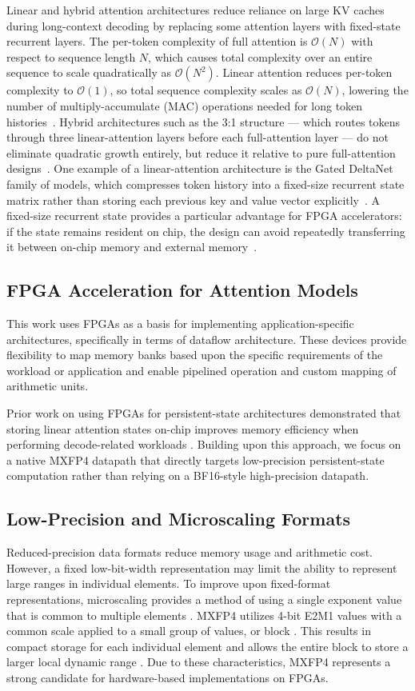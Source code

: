 ﻿\documentclass[conference]{IEEEtran}
\begin{document}
Linear and hybrid attention architectures reduce reliance on large KV caches during long-context decoding by replacing some attention layers with fixed-state recurrent layers. The per-token complexity of full attention is $\mathcal{O}(N)$ with respect to sequence length $N$, which causes total complexity over an entire sequence to scale quadratically as $\mathcal{O}(N^2)$. Linear attention reduces per-token complexity to $\mathcal{O}(1)$, so total sequence complexity scales as $\mathcal{O}(N)$, lowering the number of multiply-accumulate (MAC) operations needed for long token histories~\cite{b3}. Hybrid architectures such as the 3:1 structure --- which routes tokens through three linear-attention layers before each full-attention layer --- do not eliminate quadratic growth entirely, but reduce it relative to pure full-attention designs~\cite{b9}. One example of a linear-attention architecture is the Gated DeltaNet family of models, which compresses token history into a fixed-size recurrent state matrix rather than storing each previous key and value vector explicitly~\cite{b3}. A fixed-size recurrent state provides a particular advantage for FPGA accelerators: if the state remains resident on chip, the design can avoid repeatedly transferring it between on-chip memory and external memory~\cite{b10}.

\subsection{FPGA Acceleration for Attention Models}
This work uses FPGAs as a basis for implementing application-specific architectures, specifically in terms of dataflow architecture. These devices provide flexibility to map memory banks based upon the specific requirements of the workload or application and enable pipelined operation and custom mapping of arithmetic units.

Prior work on using FPGAs for persistent-state architectures demonstrated that storing linear attention states on-chip improves memory efficiency when performing decode-related workloads \cite{b10}. Building upon this approach, we focus on a native MXFP4 datapath that directly targets low-precision persistent-state computation rather than relying on a BF16-style high-precision datapath.


\subsection{Low-Precision and Microscaling Formats}
Reduced-precision data formats reduce memory usage and arithmetic cost. However, a fixed low-bit-width representation may limit the ability to represent large ranges in individual elements. To improve upon fixed-format representations, microscaling provides a method of using a single exponent value that is common to multiple elements \cite{b12}. MXFP4 utilizes 4-bit E2M1 values with a common scale applied to a small group of values, or block \cite{b13}. This results in compact storage for each individual element and allows the entire block to store a larger local dynamic range \cite{b14}. Due to these characteristics, MXFP4 represents a strong candidate for hardware-based implementations on FPGAs.
\end{document}
